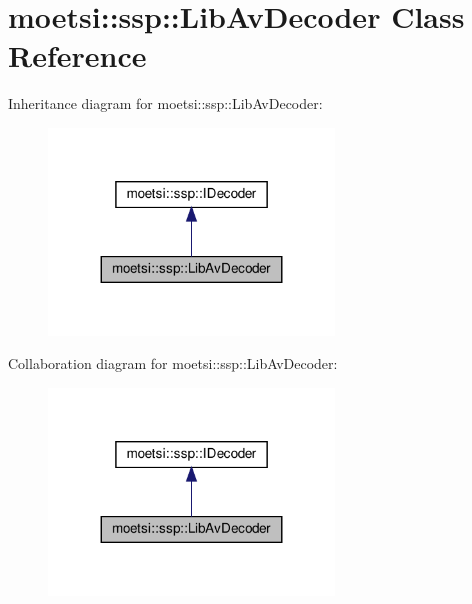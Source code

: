 \hypertarget{classmoetsi_1_1ssp_1_1LibAvDecoder}{}\section{moetsi\+:\+:ssp\+:\+:Lib\+Av\+Decoder Class Reference}
\label{classmoetsi_1_1ssp_1_1LibAvDecoder}


Inheritance diagram for moetsi\+:\+:ssp\+:\+:Lib\+Av\+Decoder\+:
\nopagebreak
\begin{figure}[H]
\begin{center}
\leavevmode
\includegraphics[width=215pt]{classmoetsi_1_1ssp_1_1LibAvDecoder__inherit__graph}
\end{center}
\end{figure}


Collaboration diagram for moetsi\+:\+:ssp\+:\+:Lib\+Av\+Decoder\+:
\nopagebreak
\begin{figure}[H]
\begin{center}
\leavevmode
\includegraphics[width=215pt]{classmoetsi_1_1ssp_1_1LibAvDecoder__coll__graph}
\end{center}
\end{figure}
